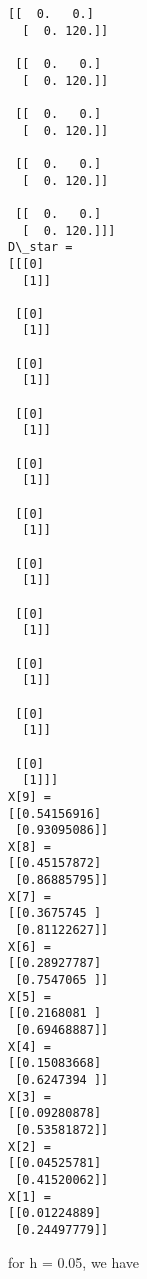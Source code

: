\documentclass[11pt]{article}
\begin{document}
\begin{Verbatim}[commandchars=\\\{\}]
 [[  0.   0.]
  [  0. 120.]]

 [[  0.   0.]
  [  0. 120.]]

 [[  0.   0.]
  [  0. 120.]]

 [[  0.   0.]
  [  0. 120.]]

 [[  0.   0.]
  [  0. 120.]]]
D\_star =
[[[0]
  [1]]

 [[0]
  [1]]

 [[0]
  [1]]

 [[0]
  [1]]

 [[0]
  [1]]

 [[0]
  [1]]

 [[0]
  [1]]

 [[0]
  [1]]

 [[0]
  [1]]

 [[0]
  [1]]

 [[0]
  [1]]]
X[9] =
[[0.54156916]
 [0.93095086]]
X[8] =
[[0.45157872]
 [0.86885795]]
X[7] =
[[0.3675745 ]
 [0.81122627]]
X[6] =
[[0.28927787]
 [0.7547065 ]]
X[5] =
[[0.2168081 ]
 [0.69468887]]
X[4] =
[[0.15083668]
 [0.6247394 ]]
X[3] =
[[0.09280878]
 [0.53581872]]
X[2] =
[[0.04525781]
 [0.41520062]]
X[1] =
[[0.01224889]
 [0.24497779]]
    \end{Verbatim}

    for h = 0.05, we have
\end{document}
